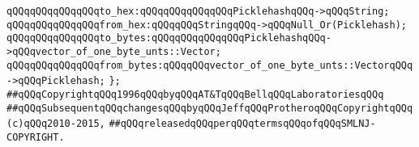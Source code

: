 \newline
\newline
\verb|qQQqqQQqqQQqqQQqto_hex:qQQqqQQqqQQqqQQqPicklehashqQQq->qQQqString;|\newline
\verb|qQQqqQQqqQQqqQQqfrom_hex:qQQqqQQqStringqQQq->qQQqNull_Or(Picklehash);|\newline
\newline
\verb|qQQqqQQqqQQqqQQqto_bytes:qQQqqQQqqQQqqQQqPicklehashqQQq->qQQqvector_of_one_byte_unts::Vector;|\newline
\verb|qQQqqQQqqQQqqQQqfrom_bytes:qQQqqQQqvector_of_one_byte_unts::VectorqQQq->qQQqPicklehash;|\newline
\verb|};|\newline
\newline
\newline
\verb|##qQQqCopyrightqQQq1996qQQqbyqQQqAT&TqQQqBellqQQqLaboratoriesqQQq|\newline
\verb|##qQQqSubsequentqQQqchangesqQQqbyqQQqJeffqQQqProtheroqQQqCopyrightqQQq(c)qQQq2010-2015,|\newline
\verb|##qQQqreleasedqQQqperqQQqtermsqQQqofqQQqSMLNJ-COPYRIGHT.|\newline


